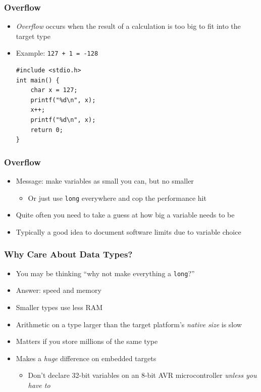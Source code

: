 \documentclass[14pt]{beamer}
\begin{document}
\begin{frame}[fragile]
\frametitle{Overflow}
\small{
\begin{itemize}
\item \textit{Overflow} occurs when the result of a calculation is too big to fit into the target type
\item Example: \texttt{127 + 1 = -128}
\begin{lstlisting}[style=CStyle]
#include <stdio.h>
int main() {
	char x = 127;
	printf("%d\n", x);
	x++;
	printf("%d\n", x);
	return 0;
}
\end{lstlisting}

\end{itemize}
}
\end{frame}

\begin{frame}
\frametitle{Overflow}
\begin{itemize}
\item Message: make variables as small you can, but no smaller
	\begin{itemize}
		\item Or just use \texttt{long} everywhere and cop the performance hit
	\end{itemize}
\item Quite often you need to take a guess at how big a variable needs to be
\item Typically a good idea to document software limits due to variable choice
\end{itemize}
\end{frame}

\begin{frame}
\frametitle{Why Care About Data Types?}
\begin{itemize}
\item You may be thinking ``why not make everything a \texttt{long}?''
\item Answer: speed and memory
\item Smaller types use less RAM
\item Arithmetic on a type larger than the target platform's \textit{native size} is slow
\item Matters if you store millions of the same type
\item Makes a \textit{huge} difference on embedded targets
\begin{itemize}
	\item Don't declare 32-bit variables on an 8-bit AVR microcontroller \textit{unless you have to}
\end{itemize}
\end{itemize}
\end{frame}
\end{document}
